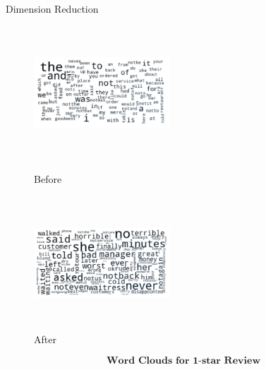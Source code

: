 \documentclass[10pt]{beamer}
\begin{document}
\begin{frame}{Dimension Reduction}
\begin{figure}[htbp]
\centering
\setlength{\belowcaptionskip}{2pt} 
\begin{minipage}[t]{0.48\textwidth}
\centering
\setlength{\belowcaptionskip}{1pt} 
\includegraphics[width=5.1cm,height=5cm]{dist1_ori.png}
\caption{Before}
\end{minipage}
\begin{minipage}[t]{0.48\textwidth}
\centering
\setlength{\belowcaptionskip}{1pt} 
\includegraphics[width=5.1cm,height=5cm]{dist1.png}
\caption{After}
\end{minipage}
\end{figure}
$$\textbf{Word Clouds for 1-star Review}$$
\end{frame}
\end{document}
